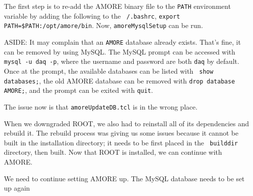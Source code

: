 \documentclass[12pt]{article}
\begin{document}
\qq The first step is to re-add the AMORE binary file to the {\tt PATH}
environment variable by adding the following to the {\tt ~/.bashrc}, {\tt export
  PATH=\$PATH:/opt/amore/bin}. Now, {\tt amoreMysqlSetup} can be run. 

\qq ASIDE: It may complain that an {\tt AMORE} database already exists. That's fine, it
can be removed by using MySQL. The MySQL prompt can be accessed with {\tt mysql
  -u daq -p}, where the username and password are both {\tt daq} by
default. Once at the prompt, the available databases can be listed with {\tt
  show databases;}, the old AMORE database can be removed with {\tt drop
  database AMORE;}, and the prompt can be exited with {\tt quit}.

\qq The issue now is that {\tt amoreUpdateDB.tcl} is in the wrong place.

\qq When we downgraded ROOT, we also had to reinstall all of its dependencies
and rebuild it. The rebuild process was giving us some issues because it cannot
be built in the installation directory; it needs to be first placed in the {\tt
  builddir} directory, then built. Now that ROOT is installed, we can continue
with AMORE.

\qq We need to continue setting AMORE up. The MySQL database needs to be set up again

\end{document}
